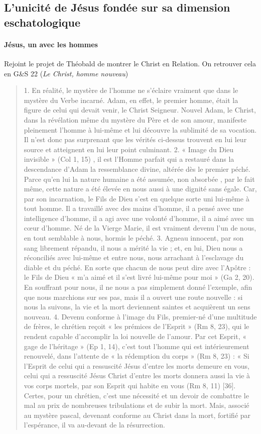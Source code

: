 \subsection{L’unicité de Jésus fondée sur sa dimension eschatologique}

\paragraph{Jésus, un avec les hommes} Rejoint le projet de Théobald de montrer le Christ en Relation. On retrouver cela en G\&S 22 (\textit{Le Christ, homme nouveau})
\begin{quote}
1. En réalité, le mystère de l’homme ne s’éclaire vraiment que dans le mystère du Verbe incarné. Adam, en effet, le premier homme, était la figure de celui qui devait venir, le Christ Seigneur. Nouvel Adam, le Christ, dans la révélation même du mystère du Père et de son amour, manifeste pleinement l’homme à lui-même et lui découvre la sublimité de sa vocation. Il n’est donc pas surprenant que les vérités ci-dessus trouvent en lui leur source et atteignent en lui leur point culminant.
2. « Image du Dieu invisible » (Col 1, 15) , il est l’Homme parfait qui a restauré dans la descendance d’Adam la ressemblance divine, altérée dès le premier péché. Parce qu’en lui la nature humaine a été assumée, non absorbée , par le fait même, cette nature a été élevée en nous aussi à une dignité sans égale. Car, par son incarnation, le Fils de Dieu s’est en quelque sorte uni lui-même à tout homme. Il a travaillé avec des mains d’homme, il a pensé avec une intelligence d’homme, il a agi avec une volonté d’homme, il a aimé avec un cœur d’homme. Né de la Vierge Marie, il est vraiment devenu l’un de nous, en tout semblable à nous, hormis le péché.
3. Agneau innocent, par son sang librement répandu, il nous a mérité la vie ; et, en lui, Dieu nous a réconciliés avec lui-même et entre nous, nous arrachant à l’esclavage du diable et du péché. En sorte que chacun de nous peut dire avec l’Apôtre : le Fils de Dieu « m’a aimé et il s’est livré lui-même pour moi » (Ga 2, 20). En souffrant pour nous, il ne nous a pas simplement donné l’exemple, afin que nous marchions sur ses pas, mais il a ouvert une route nouvelle : si nous la suivons, la vie et la mort deviennent saintes et acquièrent un sens nouveau.
4. Devenu conforme à l’image du Fils, premier-né d’une multitude de frères, le chrétien reçoit « les prémices de l’Esprit » (Rm 8, 23), qui le rendent capable d’accomplir la loi nouvelle de l’amour. Par cet Esprit, « gage de l’héritage » (Ep 1, 14), c’est tout l’homme qui est intérieurement renouvelé, dans l’attente de « la rédemption du corps » (Rm 8, 23) : « Si l’Esprit de celui qui a ressuscité Jésus d’entre les morts demeure en vous, celui qui a ressuscité Jésus Christ d’entre les morts donnera aussi la vie à vos corps mortels, par son Esprit qui habite en vous (Rm 8, 11) [36]. Certes, pour un chrétien, c’est une nécessité et un devoir de combattre le mal au prix de nombreuses tribulations et de subir la mort. Mais, associé au mystère pascal, devenant conforme au Christ dans la mort, fortifié par l’espérance, il va au-devant de la résurrection.

\end{quote}
